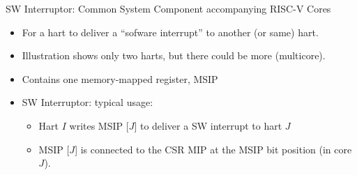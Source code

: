 \documentclass{article}
\begin{document}

\begin{center}
  {\Huge
    SW Interruptor: Common System Component accompanying RISC-V Cores}

  \vspace*{0.2in}


  \vspace*{0.3in}

  \begin{minipage}[t]{9in}
    \begin{itemize}\LARGE
    \item For a hart to deliver a ``sofware interrupt'' to another (or same) hart.
    \item Illustration shows only two harts, but there could be more (multicore).
    \item Contains one memory-mapped register, MSIP
    \item SW Interruptor: typical usage:
      \begin{itemize}
      \item Hart $I$ writes MSIP [$J$] to deliver a SW interrupt to hart $J$
      \item MSIP [$J$] is connected to the CSR MIP at the MSIP bit position (in core $J$).
      \end{itemize}
    \end{itemize}
  \end{minipage}
\end{center}

\clearpage

\end{document}

